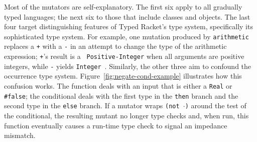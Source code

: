 Most of the mutators are self-explanatory.  The first six apply to all
gradually typed languages; the next six to those that include classes and
objects. The last four target distinguishing features of Typed Racket's type
system, specifically its sophisticated type system. For example, one mutation
produced by {\tt arithmetic} replaces a {\tt +} with a {\tt -} in an attempt to
change the type of the arithmetic expression; {\tt +}'s result is a {\tt
Positive-Integer} when all arguments are positive integers, while {\tt -}
yields {\tt Integer}~\citep{stathff-padl-12}. Similarly, the other three aim to
confound the occurrence type system. Figure~\ref{fig:negate-cond-example}
illustrates how this confusion works. The function deals with an input that is
either a {\tt Real} or {\tt \#false}; the conditional deals with the first type
in the {\tt then} branch and the second type in the {\tt else} branch.  If a
mutator wraps {\tt (not $\cdot$)} around the test of the conditional, the
resulting mutant no longer type checks and, when run, this function eventually
causes a run-time type check to signal an impedance mismatch.

